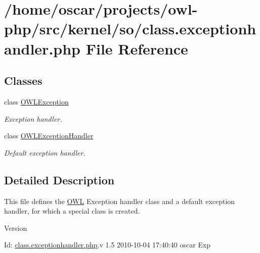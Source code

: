 \section{/home/oscar/projects/owl-\/php/src/kernel/so/class.exceptionhandler.php File Reference}
\label{class_8exceptionhandler_8php}
\subsection*{Classes}
\begin{DoxyCompactItemize}
\item 
class \hyperlink{classOWLException}{OWLException}
\begin{DoxyCompactList}\small\item\em Exception handler. \item\end{DoxyCompactList}\item 
class \hyperlink{classOWLExceptionHandler}{OWLExceptionHandler}
\begin{DoxyCompactList}\small\item\em Default exception handler. \item\end{DoxyCompactList}\end{DoxyCompactItemize}


\subsection{Detailed Description}
This file defines the \hyperlink{classOWL}{OWL} Exception handler class and a default exception handler, for which a special class is created. \begin{DoxyVersion}{Version}

\end{DoxyVersion}
\begin{DoxyParagraph}{Id:}
\hyperlink{class_8exceptionhandler_8php}{class.exceptionhandler.php},v 1.5 2010-\/10-\/04 17:40:40 oscar Exp 
\end{DoxyParagraph}
